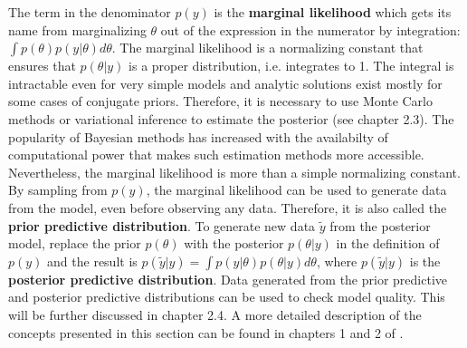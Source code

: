 The term in the denominator $p(y)$ is the \textbf{marginal likelihood} which gets its name from marginalizing $\theta$ out of the expression in the numerator by integration: $\int p(\theta) p(y|\theta)d\theta$. The marginal likelihood is a normalizing constant that ensures that $p(\theta|y)$ is a proper distribution, i.e. integrates to 1. The integral is intractable even for very simple models and analytic solutions exist mostly for some cases of conjugate priors. Therefore, it is necessary to use Monte Carlo methods or variational inference to estimate the posterior (see chapter 2.3). The popularity of Bayesian methods has increased with the availabilty of computational power that makes such estimation methods more accessible. Nevertheless, the marginal likelihood is more than a simple normalizing constant. By sampling from $p(y)$, the marginal likelihood can be used to generate data from the model, even before observing any data. Therefore, it is also called the \textbf{prior predictive distribution}. To generate new data  $\tilde y$ from the posterior model, replace the prior $p(\theta)$ with the posterior $p(\theta|y)$ in the definition of $p(y)$ and the result is $p(\tilde y|y) = \int p(y | \theta) p(\theta|y) d\theta$, where $p(\tilde y | y)$ is the \textbf{posterior predictive distribution}. Data generated from the prior predictive and posterior predictive distributions can be used to check model quality. This will be further discussed in chapter 2.4. A more detailed description of the concepts presented in this section can be found in chapters 1 and 2 of \cite{gelman_bayesian_2014}.

